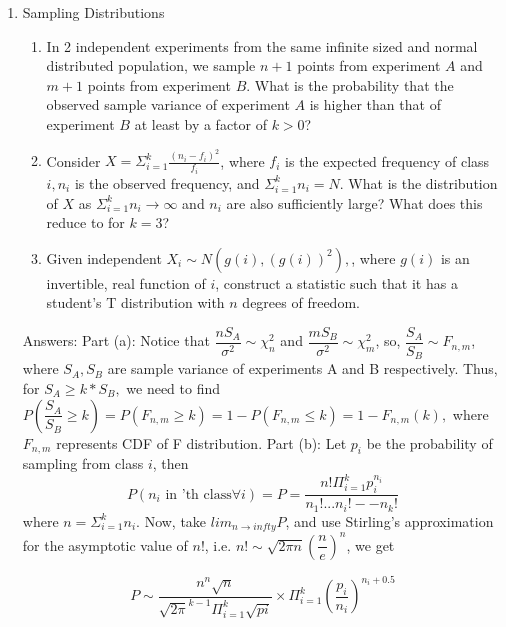 \documentclass[12pt, oneside]{article}
\begin{document}
\begin{enumerate}
\item Sampling Distributions 
\begin{enumerate}
    \item In 2 independent experiments from the same infinite sized and normal distributed population, we sample $n+1$ points from experiment $A$ and $m+1$ points from experiment $B$. What is the probability that the observed sample variance of experiment $A$ is higher than that of experiment $B$ at least by a factor of $k > 0$?
    \item Consider $X = \Sigma_{i=1}^{k} \frac{(n_i - f_i)^2}{f_i}$, where $f_i$ is the expected frequency of class $i, n_i$ is the observed frequency, and $\Sigma_{i=1}^{k} n_i = N$. What is the distribution of $X$ as $\Sigma_{i=1}^{k} n_i \to \infty$ and $n_i$ are also sufficiently large? What does this reduce to for $k=3$?
    \item Given independent $X_i \sim N(g(i),(g(i))^2),$, where $g(i)$ is an invertible, real function of $i$, construct a statistic such that it has a student's T distribution with $n$ degrees of freedom. 
\end{enumerate}
Answers:
\newline Part (a): Notice that $\dfrac{nS_A}{\sigma^2} \sim \chi_{n}^2$ and $\dfrac{mS_B}{\sigma^2} \sim \chi_{m}^2$, so, $\dfrac{S_A}{S_B} \sim F_{n,m}$, where $S_A,S_B$ are sample variance of experiments A and B respectively. Thus, for $S_A \ge k*S_B,$ we need to find $P(\dfrac{S_A}{S_B}\ge k) = P(F_{n,m} \ge k) = 1 - P(F_{n,m} \le k) = 1 - F_{n,m}(k),$ where $F_{n,m}$ represents CDF of F distribution. 
\newline Part (b): Let $p_i$ be the probability of sampling from class $i$, then 
$$P(n_i \text{ in 'th class} \forall i) = P = \dfrac{n! \Pi_{i=1}^{k} p_i^{n_i}}{n_1!...n_i!--n_k!}$$ where $n = \Sigma_{i=1}^{k} n_i$.
Now, take $lim_{n \to infty} P$, and use Stirling's approximation for the asymptotic value of $n!$, i.e. $n! \sim \sqrt{2\pi n} (\dfrac{n}{e})^n$, we get

$$P \sim \dfrac{n^n\sqrt{n}}{\sqrt{2\pi}^{k-1} \Pi_{i=1}^{k} \sqrt{pi}} \times \Pi_{i=1}^{k} (\dfrac{p_i}{n_i})^{n_i+0.5} 
$$


\end{enumerate}
\end{document}
